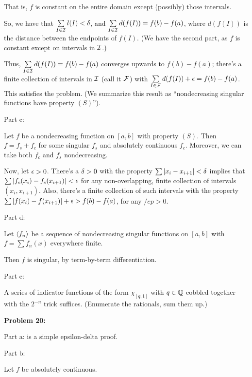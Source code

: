 \documentclass[a4paper,12pt]{article}
\begin{document}
That is, $f$ is constant on the entire domain except (possibly) those intervals.

So, we have that $\sum\limits_{I \in \mathcal{I}} l(I) < \delta$, and $\sum\limits_{I \in \mathcal{I}} d(f(I)) = f(b)-f(a)$, where $d(f(I))$ is the distance between the endpoints of $f(I)$. (We have the second part, as $f$ is constant except on intervals in $\mathcal{I}$.)

Thus, $\sum\limits_{I \in \mathcal{I}} d(f(I)) = f(b)-f(a)$ converges upwards to $f(b)-f(a)$; there's a finite collection of intervals in $\mathcal{I}$ (call it $\mathcal{F}$) with $\sum\limits_{I \in \mathcal{F}} d(f(I)) + \epsilon = f(b) -f(a)$. This satisfies the problem. (We summarize this result as ``nondecreasing singular functions have property $(S)$'').

\shunt

Part c:

Let $f$ be a nondecreasing function on $[a,b]$ with property $(S)$. Then $f=f_s+f_c$ for some singular $f_s$ and absolutely continuous $f_c$. Moreover, we can take both $f_c$ and $f_s$ nondecreasing.

Now, let $\epsilon>0$. There's a $\delta>0$ with the property $\sum \left\lvert x_i-x_{i+1} \right\rvert < \delta$ implies that $\sum \left\lvert f_c(x_i)-f_c(x_{i+1}) \right\rvert < \epsilon$ for any non-overlapping, finite collection of intervals $(x_i,x_{i+1})$. Also, there's a finite collection of such intervals with the property $\sum \left\lvert f(x_i)-f(x_{i+1}) \right\rvert +\epsilon > f(b)-f(a)$, for any $/ep>0$. %

\shunt

Part d:

Let $\left\langle f_n \right\rangle$ be a sequence of nondecreasing singular functions on $[a,b]$ with $f = \sum f_n(x)$ everywhere finite.

Then $f$ is singular, by term-by-term differentiation.

\shunt

Part e:

A series of indicator functions of the form $\chi_{[q,1]}$ with $q \in \mathbb{Q}$ cobbled together with the $2^{-n}$ trick suffices. (Enumerate the rationals, sum them up.)

\shunt

{\bf Problem 20:}

Part a: is a simple epsilon-delta proof.

\shunt

Part b:

Let $f$ be absolutely continuous.
\end{document}
